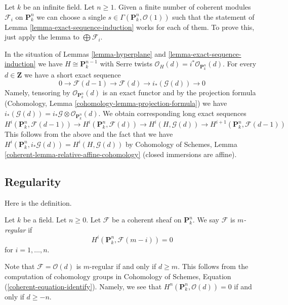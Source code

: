 \begin{remark}
\label{remark-exact-sequence-induction}
Let $k$ be an infinite field. Let $n \geq 1$. Given a finite number
of coherent modules $\mathcal{F}_i$ on $\mathbf{P}^n_k$ we can choose
a single $s \in \Gamma(\mathbf{P}^n_k, \mathcal{O}(1))$ such
that the statement of Lemma \ref{lemma-exact-sequence-induction}
works for each of them.
To prove this, just apply the lemma to $\bigoplus \mathcal{F}_i$.
\end{remark}

\begin{remark}
\label{remark-exact-sequence-induction-cohomology}
In the situation of Lemmas \ref{lemma-hyperplane} and
\ref{lemma-exact-sequence-induction}
we have $H \cong \mathbf{P}^{n - 1}_k$ with Serre twists
$\mathcal{O}_H(d) = i^*\mathcal{O}_{\mathbf{P}^n_k}(d)$.
For every $d \in \mathbf{Z}$ we have a short exact sequence
$$
0 \to \mathcal{F}(d - 1) \to \mathcal{F}(d) \to i_*(\mathcal{G}(d)) \to 0
$$
Namely, tensoring by $\mathcal{O}_{\mathbf{P}^n_k}(d)$ is an
exact functor and by the projection formula
(Cohomology, Lemma \ref{cohomology-lemma-projection-formula})
we have
$i_*(\mathcal{G}(d)) = i_*\mathcal{G} \otimes \mathcal{O}_{\mathbf{P}^n_k}(d)$.
We obtain corresponding long exact sequences
$$
H^i(\mathbf{P}^n_k, \mathcal{F}(d - 1)) \to
H^i(\mathbf{P}^n_k, \mathcal{F}(d)) \to
H^i(H, \mathcal{G}(d)) \to
H^{i + 1}(\mathbf{P}^n_k, \mathcal{F}(d - 1))
$$
This follows from the above and the fact that we have
$H^i(\mathbf{P}^n_k, i_*\mathcal{G}(d)) = H^i(H, \mathcal{G}(d))$ by
Cohomology of Schemes, Lemma \ref{coherent-lemma-relative-affine-cohomology}
(closed immersions are affine).
\end{remark}





\subsection{Regularity}
\label{subsection-regularity}

\noindent
Here is the definition.

\begin{definition}
\label{definition-regularity}
Let $k$ be a field. Let $n \geq 0$. Let $\mathcal{F}$ be a coherent
sheaf on $\mathbf{P}^n_k$. We say $\mathcal{F}$ is {\it $m$-regular}
if
$$
H^i(\mathbf{P}^n_k, \mathcal{F}(m - i)) = 0
$$
for $i = 1, \ldots, n$.
\end{definition}

\noindent
Note that $\mathcal{F} = \mathcal{O}(d)$ is $m$-regular if and only
if $d \geq m$. This follows from the computation of cohomology groups
in Cohomology of Schemes, Equation (\ref{coherent-equation-identify}).
Namely, we see that $H^n(\mathbf{P}^n_k, \mathcal{O}(d)) = 0$
if and only if $d \geq -n$.

